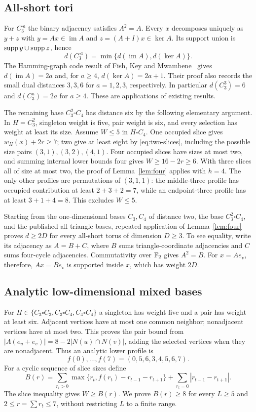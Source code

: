 \subsection*{All-short tori}
For $C_3^{\square a}$ the binary adjacency satisfies $A^2=A$. Every $x$ decomposes uniquely as $y+z$ with $y=Ax\in\operatorname{im}A$ and $z=(A+I)x\in\ker A$. Its support union is $\operatorname{supp} y\cup\operatorname{supp} z$, hence
\[
 d(C_3^{\square a})=\min\{d(\operatorname{im}A),d(\ker A)\}.
\]
The Hamming-graph code result of Fish, Key and Mwambene~\cite{fishhamming} gives $d(\operatorname{im}A)=2a$ and, for $a\ge4$, $d(\ker A)=2a+1$. Their proof also records the small dual distances $3,3,6$ for $a=1,2,3$, respectively. In particular $d(C_3^3)=6$ and $d(C_3^a)=2a$ for $a\ge4$. These are applications of existing results.

The remaining base $C_3^2\square C_4$ has distance six by the following elementary argument. In $H=C_3^2$, singleton weight is five, pair weight is six, and every selection has weight at least its size. Assume $W\le5$ in $H\square C_4$. One occupied slice gives $w_H(x)+2r\ge7$; two give at least eight by \eqref{eq:two-slices}, including the possible size pairs $(3,1),(3,2),(4,1)$. Four occupied slices have sizes at most two, and summing internal lower bounds four gives $W\ge16-2r\ge6$. With three slices all of size at most two, the proof of Lemma~\ref{lem:four} applies with $h=4$. The only other profiles are permutations of $(3,1,1)$: the middle-three profile has occupied contribution at least $2+3+2=7$, while an endpoint-three profile has at least $3+1+4=8$. This excludes $W\le5$.

Starting from the one-dimensional bases $C_3,C_4$ of distance two, the base $C_3^2\square C_4$, and the published all-triangle bases, repeated application of Lemma~\ref{lem:four} proves $d\ge2D$ for every all-short torus of dimension $D\ge3$. To see equality, write its adjacency as $A=B+C$, where $B$ sums triangle-coordinate adjacencies and $C$ sums four-cycle adjacencies. Commutativity over $\mathbb F_2$ gives $A^2=B$. For $x=Ae_v$, therefore, $Ax=Be_v$ is supported inside $x$, which has weight $2D$.

\subsection*{Analytic low-dimensional mixed bases}
For $H\in\{C_3\square C_3,C_3\square C_4,C_4\square C_4\}$ a singleton has weight five and a pair has weight at least six. Adjacent vertices have at most one common neighbor; nonadjacent vertices have at most two. This proves the pair bound from $|A(e_u+e_v)|=8-2|N(u)\cap N(v)|$, adding the selected vertices when they are nonadjacent. Thus an analytic lower profile is
\[
 f(0),\ldots,f(7)=(0,5,6,3,4,5,6,7).
\]
For a cyclic sequence of slice sizes define
\begin{equation}\label{eq:profile}
 B(r)=\sum_{r_t>0}\max\{r_t,f(r_t)-r_{t-1}-r_{t+1}\}
       +\sum_{r_t=0}|r_{t-1}-r_{t+1}|.
\end{equation}
The slice inequality gives $W\ge B(r)$. We prove $B(r)\ge8$ for every $L\ge5$ and $2\le r=\sum r_t\le7$, without restricting $L$ to a finite range.

